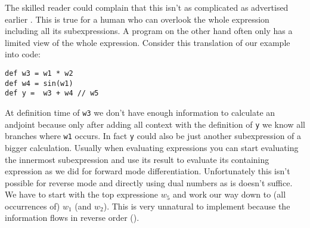 The skilled reader could complain that this isn't as complicated as advertised \todowording earlier . This is true for a human who can overlook the whole expression including all its subexpressions. A program on the other hand often only has a limited view of the whole expression. Consider this translation of our example into code:
\begin{lstlisting}
def w3 = w1 * w2
def w4 = sin(w1)
def y =  w3 + w4 // w5
\end{lstlisting}
At definition time of \lstinline{w3} we don't have enough information to calculate an andjoint because only after adding all context with the definition of \lstinline{y} we know all branches where \lstinline{w1} occurs. In fact \lstinline{y} could also be just another subexpression of a bigger calculation. Usually when evaluating expressions you can start evaluating the innermost subexpression and use its result to evaluate its containing expression as we did for forward mode differentiation. Unfortunately this isn't possible for reverse mode and directly using dual numbers as is doesn't suffice. We have to start with the top expressione $w_5$ and work our way down to (all occurrences of) $w_1$ (and $w_2$). This is very unnatural to implement because the information flows in reverse order ().
